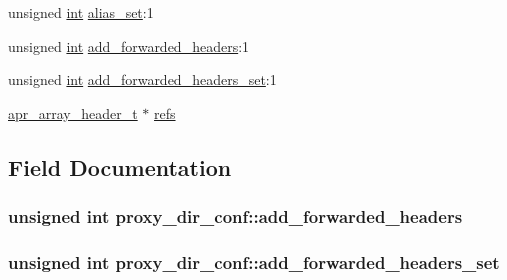 \begin{DoxyCompactItemize}
unsigned \hyperlink{pcre_8txt_a42dfa4ff673c82d8efe7144098fbc198}{int} \hyperlink{structproxy__dir__conf_a45e58d5fe6b05e3eaabbc1c73aa614b8}{alias\+\_\+set}\+:1
\item 
unsigned \hyperlink{pcre_8txt_a42dfa4ff673c82d8efe7144098fbc198}{int} \hyperlink{structproxy__dir__conf_ad853b7529bf7d89d75489496699e4009}{add\+\_\+forwarded\+\_\+headers}\+:1
\item 
unsigned \hyperlink{pcre_8txt_a42dfa4ff673c82d8efe7144098fbc198}{int} \hyperlink{structproxy__dir__conf_a26f600a154da8f059d4b0edefab99a57}{add\+\_\+forwarded\+\_\+headers\+\_\+set}\+:1
\item 
\hyperlink{structapr__array__header__t}{apr\+\_\+array\+\_\+header\+\_\+t} $\ast$ \hyperlink{structproxy__dir__conf_a4bbe4a2bdb6f8c42b64dd98e29302254}{refs}
\end{DoxyCompactItemize}


\subsection{Field Documentation}
\subsubsection[{\texorpdfstring{add\+\_\+forwarded\+\_\+headers}{add_forwarded_headers}}]{\setlength{\rightskip}{0pt plus 5cm}unsigned {\bf int} proxy\+\_\+dir\+\_\+conf\+::add\+\_\+forwarded\+\_\+headers}\hypertarget{structproxy__dir__conf_ad853b7529bf7d89d75489496699e4009}{}\label{structproxy__dir__conf_ad853b7529bf7d89d75489496699e4009}
\subsubsection[{\texorpdfstring{add\+\_\+forwarded\+\_\+headers\+\_\+set}{add_forwarded_headers_set}}]{\setlength{\rightskip}{0pt plus 5cm}unsigned {\bf int} proxy\+\_\+dir\+\_\+conf\+::add\+\_\+forwarded\+\_\+headers\+\_\+set}\hypertarget{structproxy__dir__conf_a26f600a154da8f059d4b0edefab99a57}{}\label{structproxy__dir__conf_a26f600a154da8f059d4b0edefab99a57}
